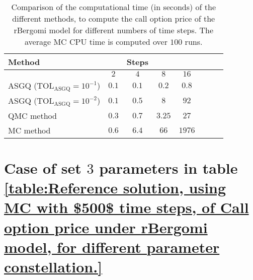 \FloatBarrier
\begin{table}[h!]
	\centering
	\begin{tabular}{l*{6}{c}r}
		\toprule[1.5pt]
		Method & & Steps  & &     \\
		\hline	
		& $2$ & $4$ & $8$ & $16$ &   \\
		\hline
		ASGQ ($\text{TOL}_{\text{ASGQ}}=10^{-1}$)  & $0.1$ & $0.1$ & $0.2$ & $0.8$ \\
		ASGQ ($\text{TOL}_{\text{ASGQ}}=10^{-2}$)  & $0.1$ & $0.5$ & $8$ & $92$ \\
		\hline
		QMC method   & $ 0.3$  & $ 0.7$  & $ 3.25$ & $ 27$  \\	
		\hline
		MC method   & $ 0.6$  & $  6.4$  & $  66$ & $ 1976$  \\	
		
		\bottomrule[1.25pt]
	\end{tabular}
	\caption{Comparison of the computational time (in seconds) of  the different methods, to compute the call option price of the rBergomi model for different numbers of time steps. The average  MC CPU time is computed over $100$ runs. }
	\label{Comparsion of the computational time of  MC and MISC, used to compute Call option price of rBergomi model for different number of time steps. Case set3}
\end{table}

\FloatBarrier

\section{Case of set $3$ parameters in table \ref{table:Reference solution, using MC with $500$ time steps, of Call option price under rBergomi model, for different parameter constellation.}}\label{appendix:Case of set 3 parameters}


